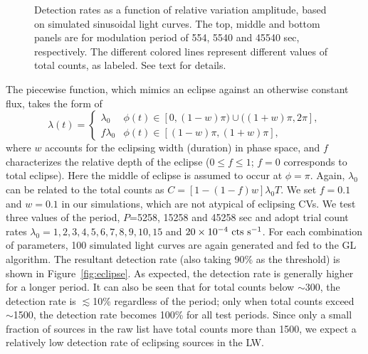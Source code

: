 \documentclass[fleqn,usenatbib]{mnras}
\begin{document}
\begin{figure}
\begin{minipage}[b]{0.45\textwidth}
\end{minipage}
\caption{Detection rates as a function of relative variation amplitude, based on simulated sinusoidal light curves. The top, middle and bottom panels are for modulation period of 554, 5540 and 45540 sec, respectively. The different colored lines represent different values of total counts, as labeled. See text for details.
\label{fig:detection}}
\end{figure}

The piecewise function, which mimics an eclipse against an otherwise constant flux, takes the form of
\begin{equation}
\lambda(t)=
\begin{cases}
\lambda_0 & \text{$\phi(t) \in[0,(1-w)\pi)\cup ((1+w)\pi,2\pi]$},\\
f\lambda_0 & \text{$\phi(t) \in[(1-w)\pi,(1+w)\pi]$},
\end{cases}	
\end{equation}
where $w$ accounts for the eclipsing width (duration) in phase space, and $f$ characterizes the relative depth of the eclipse ($0\leq f \leq 1$; $f = 0$ corresponds to total eclipse). Here the middle of eclipse is assumed to occur at $\phi = \pi$. 
Again, $\lambda_0$ can be related to the total counts as $C=[1-(1-f)w]\lambda_0T$.
We set $f=0.1$ and $w=0.1$ in our simulations, which are not atypical of eclipsing CVs. 
We test three values of the period, $P$=5258, 15258 and 45258 sec and adopt trial count rates $\lambda_0 = 1, 2, 3, 4, 5, 6, 7, 8, 9, 10, 15$ and $20\times10^{-4}{\rm~cts~s^{-1}}$.
For each combination of parameters, 100 simulated light curves are again generated and fed to the GL algorithm. 
The resultant detection rate (also taking 90\% as the threshold) is shown in Figure~\ref{fig:eclipse}. 
As expected, the detection rate is generally higher for a longer period.
It can also be seen that for total counts below $\sim$300, the detection rate is $\lesssim$10\% regardless of the period; only when total counts exceed $\sim$1500, the detection rate becomes 100\% for all test periods. 
Since only a small fraction of sources in the raw list have total counts more than 1500, we expect a relatively low detection rate of eclipsing sources in the LW.  
 
\end{document}
